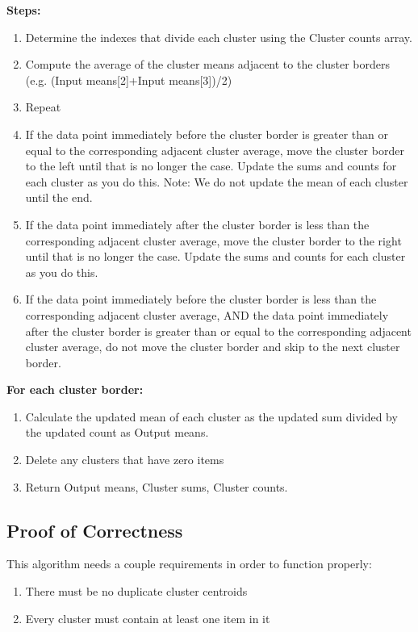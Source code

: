 \documentclass[conference]{IEEEtran}
\begin{document}
\textbf{Steps:}
\begin{enumerate}
    \item Determine the indexes that divide each cluster using the Cluster counts array.
    \item Compute the average of the cluster means adjacent to the cluster borders (e.g. (Input means[2]+Input means[3])/2)
    \item Repeat
    \item If the data point immediately before the cluster border is greater than or equal to the corresponding adjacent cluster average, move the cluster border to the left until that is no longer the case. Update the sums and counts for each cluster as you do this. Note: We do not update the mean of each cluster until the end.
    \item If the data point immediately after the cluster border is less than the corresponding adjacent cluster average, move the cluster border to the right until that is no longer the case. Update the sums and counts for each cluster as you do this.
    \item If the data point immediately before the cluster border is less than the corresponding adjacent cluster average, AND the data point immediately after the cluster border is greater than or equal to the corresponding adjacent cluster average, do not move the cluster border and skip to the next cluster border.
\end{enumerate}

\textbf{For each cluster border:}
\begin{enumerate}
    \item Calculate the updated mean of each cluster as the updated sum divided by the updated count as Output means.
    \item Delete any clusters that have zero items
    \item Return Output means, Cluster sums, Cluster counts.
\end{enumerate}

\subsection{Proof of Correctness}

This algorithm needs a couple requirements in order to function properly:
\begin{enumerate}
    \item There must be no duplicate cluster centroids
    \item Every cluster must contain at least one item in it
\end{enumerate}
\end{document}
